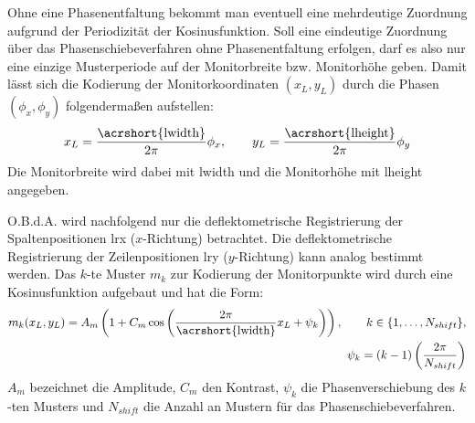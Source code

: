Ohne eine Phasenentfaltung bekommt man eventuell eine mehrdeutige Zuordnung aufgrund der Periodizität der Kosinusfunktion.
Soll eine eindeutige Zuordnung über das Phasenschiebeverfahren ohne Phasenentfaltung erfolgen, darf es also nur eine einzige Musterperiode auf der Monitorbreite bzw. Monitorhöhe geben.
Damit lässt sich die Kodierung der Monitorkoordinaten $(x_{L}, y_{L})$ durch die Phasen $(\phi_{x}, \phi_{y})$ folgendermaßen aufstellen:
%
\begin{equation}
	x_{L} = \dfrac{\text{\acrshort{lwidth}}}{2\pi}\phi_{x},
	\qquad
	y_{L} = \dfrac{\text{\acrshort{lheight}}}{2\pi}\phi_{y}
\end{equation}
%
\noindent
Die Monitorbreite wird dabei mit \acrshort{lwidth} und die Monitorhöhe mit \acrshort{lheight} angegeben.

\p
O.B.d.A. wird nachfolgend nur die deflektometrische Registrierung der Spaltenpositionen \acrshort{lrx} ($x$-Richtung) betrachtet.
Die deflektometrische Registrierung der Zeilenpositionen \acrshort{lry} ($y$-Richtung) kann analog bestimmt werden.
Das $k$-te Muster $m_k$ zur Kodierung der Monitorpunkte wird durch eine Kosinusfunktion aufgebaut und hat die Form:
%
\begin{equation}
	\begin{split}	
		m_k(x_L,y_L) = A_m \left(1 + C_m \cos \left(\dfrac{2\pi}{\text{\acrshort{lwidth}}} x_L + \psi_k\right)\right),
		\qquad
		k \in \lbrace 1,\ldots,N_{shift}\rbrace, \\
		\psi_k = (k - 1)\left(\dfrac{2\pi}{N_{shift}}\right)
	\end{split}
\end{equation}
%
$A_m$ bezeichnet die Amplitude, $C_m$ den Kontrast, $\psi_k$ die Phasenverschiebung des $k$-ten Musters und $N_{shift}$ die Anzahl an Mustern für das Phasenschiebeverfahren.